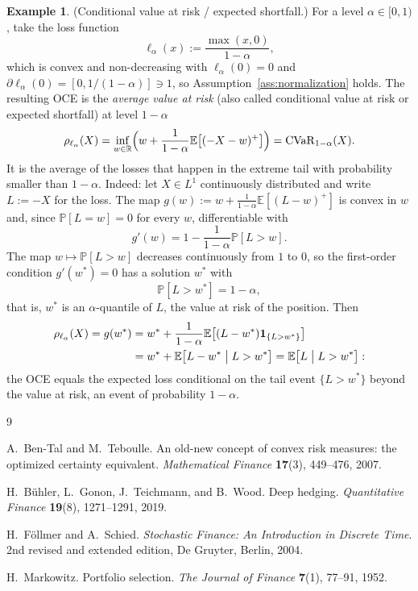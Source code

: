 \documentclass[11pt,a4paper]{report}
\numberwithin{equation}{chapter}
\theoremstyle{plain}
\theoremstyle{definition}
\newtheorem{example}[proposition]{Example}
\newcommand{\E}{\mathbb{E}}
\newcommand{\PP}{\mathbb{P}}
\newcommand{\R}{\mathbb{R}}
\begin{document}
\begin{example}\label{ex:cvar}
    (Conditional value at risk / expected shortfall.) For a level $\alpha\in[0,1)$, take the loss function
    \[
        \ell_\alpha(x):=\frac{\max(x,0)}{1-\alpha},
    \]
    which is convex and non-decreasing with $\ell_\alpha(0)=0$ and $\partial\ell_\alpha(0)=[0,1/(1-\alpha)]\ni1$, so Assumption~\ref{ass:normalization} holds. The resulting OCE is the \emph{average value at risk} (also called conditional value at risk or expected shortfall) at level $1-\alpha$
    \[
        \rho_{\ell_\alpha}(X)=\inf_{w\in\R}\Bigl(w+\frac{1}{1-\alpha}\E\bigl[(-X-w)^+\bigr]\Bigr)=\mathrm{CVaR}_{1-\alpha}(X).
    \]
    It is the average of the losses that happen in the extreme tail with probability smaller than $1-\alpha$. Indeed: let $X\in L^1$ continuously distributed and write $L:=-X$ for the loss. The map $g(w):=w+\frac{1}{1-\alpha}\E[(L-w)^+]$ is convex in $w$ and, since $\PP[L=w]=0$ for every $w$, differentiable with
    \[
        g'(w)=1-\frac{1}{1-\alpha}\PP[L>w].
    \]
    The map $w\mapsto\PP[L>w]$ decreases continuously from $1$ to $0$, so the first-order condition $g'(w^*)=0$ has a solution $w^*$ with
    \[
        \PP[L>w^*]=1-\alpha,
    \]
    that is, $w^*$ is an $\alpha$-quantile of $L$, the value at risk of the position. Then
    \begin{align*}
        \rho_{\ell_\alpha}(X)=g(w^*) & =w^*+\frac{1}{1-\alpha}\E\bigl[(L-w^*)\mathbf{1}_{\{L>w^*\}}\bigr] \\
                                     & =w^*+\E\bigl[L-w^*\bigm|L>w^*\bigr]=\E\bigl[L\bigm|L>w^*\bigr]:
    \end{align*}
    the OCE equals the expected loss conditional on the tail event $\{L>w^*\}$ beyond the value at risk, an event of probability $1-\alpha$.
\end{example}

\begin{thebibliography}{9}

    A.~Ben-Tal and M.~Teboulle.
    An old-new concept of convex risk measures: the optimized certainty equivalent.
    \emph{Mathematical Finance} \textbf{17}(3), 449--476, 2007.

    H.~B\"uhler, L.~Gonon, J.~Teichmann, and B.~Wood.
    Deep hedging.
    \emph{Quantitative Finance} \textbf{19}(8), 1271--1291, 2019.

    H.~F\"ollmer and A.~Schied.
    \emph{Stochastic Finance: An Introduction in Discrete Time}.
    2nd revised and extended edition, De Gruyter, Berlin, 2004.

    H.~Markowitz.
    Portfolio selection.
    \emph{The Journal of Finance} \textbf{7}(1), 77--91, 1952.

\end{thebibliography}
\end{document}
